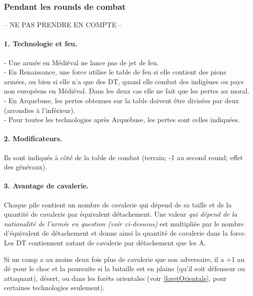 \subsubsection{Pendant les rounds de combat}
-- NE PAS PRENDRE EN COMPTE --


\paragraph{1. Technologie et feu.}
- Une armée en Médiéval ne lance pas de jet de feu. \\
- En Renaissance, une force utilise le table de feu si elle contient des pions armées, ou bien
si elle n'a que des DT, quand elle combat des indigènes ou pays non européens en Médiéval.
Dans les deux cas elle ne fait que les pertes au moral. \\
- En Arquebuse, les pertes obtenues sur la table doivent être divisées par deux
(arrondies à l'inférieur). \\
- Pour toutes les technologies après Arquebuse,  les pertes sont celles indiquées.

\paragraph{2. Modificateurs.}
Ils sont indiqués à côté de la table de combat (terrain; -1 au second round;
effet des généraux).


\paragraph{3. Avantage de cavalerie.}
Chaque pile contient un nombre de cavalerie qui dépend de sa taille et
de la quantité de cavalerie par équivalent détachement. Une valeur \textit{qui dépend
de la nationalité de l'armée en question (voir ci-dessous)} est multipliée par
le nombre d'équivalent de détachement et donne ainsi la quantité de cavalerie
dans la force. Les DT contiennent autant de cavalerie  par détachement que les A.

Si un camp a au moins deux fois plus de cavalerie que son adversaire,
il a +1 au dé pour le choc et la poursuite si la bataille est en plaine
(qu'il soit défenseur ou attaquant), désert, ou dans les forêts orientales (voir
\ref{foretOrientale}, pour certaines technologies seulement).



